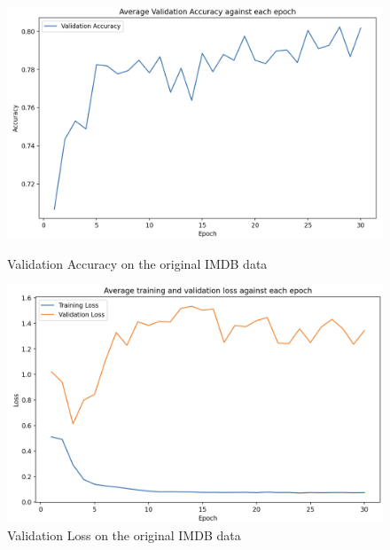 \documentclass[aoas]{imsart}
\numberwithin{equation}{section}
\theoremstyle{plain}
\theoremstyle{remark}
\begin{document}
\begin{figure}[ht]
    \centering
    \begin{minipage}{0.45\textwidth}
        \centering
        \includegraphics[width=\textwidth]{img/imdb_dev.png}
        \caption{Validation Accuracy on the original IMDB data}
        \label{Fig19: imdbdev}
    \end{minipage}
    \hfill
    \begin{minipage}{0.45\textwidth}
        \centering
        \includegraphics[width=\textwidth]{img/imdb_loss.png}
        \caption{Validation Loss on the original IMDB data}
        \label{Fig20: imdbloss}
    \end{minipage}
\end{figure}
\end{document}
